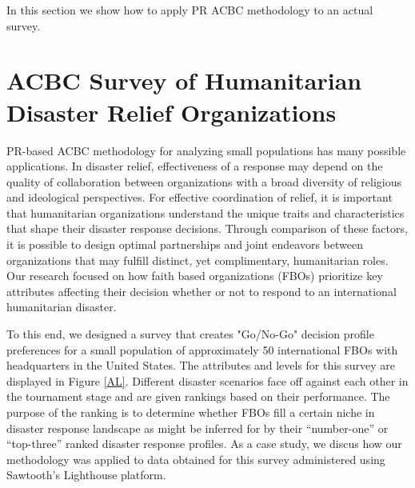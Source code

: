 \documentclass[a4paper, 12pt]{article}
\begin{document}
In this section we show how to apply PR ACBC methodology to an actual survey.

\section{ACBC Survey of Humanitarian Disaster Relief Organizations}

PR-based ACBC methodology for analyzing small populations has many possible applications. In disaster relief, effectiveness of a response may depend on the quality of collaboration between organizations with a broad diversity of religious and ideological perspectives. For effective coordination of relief, it is important that humanitarian organizations understand the unique traits and characteristics that shape their disaster response decisions. Through comparison of these factors, it is possible to design optimal partnerships and joint endeavors between organizations that may fulfill distinct, yet complimentary, humanitarian roles. Our research focused on how faith based organizations (FBOs) prioritize key attributes affecting their decision whether or not to respond to an international humanitarian disaster.

To this end, we designed a survey that creates "Go/No-Go" decision profile preferences for a small population of approximately 50 international FBOs with headquarters in the United States. The attributes and levels for this survey are displayed in Figure \ref{AL}. Different disaster scenarios face off against each other in the tournament stage and are given rankings based on their performance. The purpose of the ranking is to determine whether FBOs fill a certain niche in disaster response landscape as might be inferred for by their ``number-one'' or ``top-three'' ranked disaster response profiles. As a case study, we discus how our methodology was applied to data obtained for this survey administered using Sawtooth's Lighthouse platform.
\end{document}
